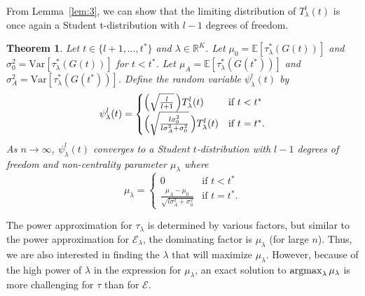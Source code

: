 \documentclass[10pt,journal,compsoc]{IEEEtran}
\newtheorem{theorem}{Theorem}
\theoremstyle{definition}
\newcommand{\argmax}{\operatornamewithlimits{argmax}}
\begin{document}
From Lemma~\ref{lem:3}, we can show that the limiting distribution of
$T_{\lambda}^{l}(t)$ is once again a Student t-distribution with
$l-1$ degrees of freedom.
\begin{theorem}
  \label{thm:5}
  Let $t \in \{l+1, \dots, t^{*}\}$ and $\lambda \in
  \mathbb{R}^{K}$. Let $\mu_0 = \mathbb{E}[\tau_{\lambda}^{*}(G(t))]$
  and $\sigma_0^{2} = \mathrm{Var}[\tau_{\lambda}^{*}(G(t))]$ for $t <
  t^{*}$. Let $\mu_A = \mathbb{E}[\tau_{\lambda}^{*}(G(t^{*}))]$ and
  $\sigma_{A}^{2} = \mathrm{Var}[\tau_{\lambda}^{*}(G(t^{*}))]$. Define
  the random variable $\psi_{\lambda}^{l}(t)$ by
  \begin{equation}
    \label{eq:50}
    \psi_{\lambda}^{l}(t) = \begin{cases}
      \Bigl(\sqrt{\tfrac{l}{l+1}}\,\Bigr) T_{\lambda}^{l}(t) & \text{if $t <
        t^{*}$} \\
      \Bigl(\sqrt{\tfrac{l \sigma_0^{2}}{l \sigma_A^{2} + \sigma_0^{2}} }\,\Bigr)
      T_{\lambda}^{l}(t) & \text{if $t = t^{*}$}.
        \end{cases}
  \end{equation}
  As $n \rightarrow \infty$, $\psi_{\lambda}^{l}(t)$ converges to a Student $t$-distribution with $l - 1$ degrees of freedom and
  non-centrality parameter $\mu_{\lambda}$ where
  \begin{equation}
    \label{eq:51}
    \mu_{\lambda} = \begin{cases} 0 & \text{if $t < t^{*}$} \\
      \frac{\mu_A - \mu_0}{\sqrt{l \sigma_A^{2} + \sigma_0^{2}}} &
       \text{if $t = t^{*}$}.
      \end{cases}
  \end{equation}
\end{theorem}
The power approximation for $\tau_{\lambda}$ is determined by various
factors, but similar to the power approximation for
$\mathcal{E}_{\lambda}$, the dominating factor is $\mu_\lambda$ (for
large $n$). Thus, we are also interested in finding the $\lambda$
that will maximize $\mu_\lambda$. However, because of the high power
of $\lambda$ in the expression for $\mu_{\lambda}$, an exact 
solution to $\argmax_{\lambda}{\mu_{\lambda}}$ is more challenging for
$\tau$ than for $\mathcal{E}$. 
\end{document}
